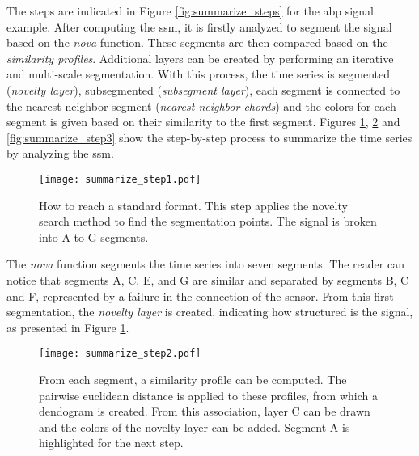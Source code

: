The steps are indicated in Figure \ref{fig:summarize_steps} for the \gls{abp} signal example. After computing the \gls{ssm}, it is firstly analyzed to segment the signal based on the \textit{nova} function. These segments are then compared based on the \textit{similarity profiles}. Additional layers can be created by performing an iterative and multi-scale segmentation. With this process, the time series is segmented (\textit{novelty layer}), subsegmented (\textit{subsegment layer}), each segment is connected to the nearest neighbor segment (\textit{nearest neighbor chords}) and the colors for each segment is given based on their similarity to the first segment. Figures \ref{fig:summarize_step1}, \ref{fig:summarize_step2} and \ref{fig:summarize_step3} show the step-by-step process to summarize the time series by analyzing the \gls{ssm}. 

\begin{figure}
\centering
\texttt{[image: summarize\_step1.pdf]}
\caption{How to reach a standard format. This step applies the novelty search method to find the segmentation points. The signal is broken into A to G segments.}
\label{fig:summarize_step1}
\end{figure}

The \textit{nova} function segments the time series into seven segments. The reader can notice that segments A, C, E, and G are similar and separated by segments B, C and F, represented by a failure in the connection of the sensor. From this first segmentation, the \textit{novelty layer} is created, indicating how structured is the signal, as presented in Figure \ref{fig:summarize_step1}.

\begin{figure}
\centering
\texttt{[image: summarize\_step2.pdf]}
\caption{From each segment, a similarity profile can be computed. The pairwise euclidean distance is applied to these profiles, from which a dendogram is created. From this association, layer C can be drawn and the colors of the novelty layer can be added. Segment A is highlighted for the next step.}
\label{fig:summarize_step2}
\end{figure}

